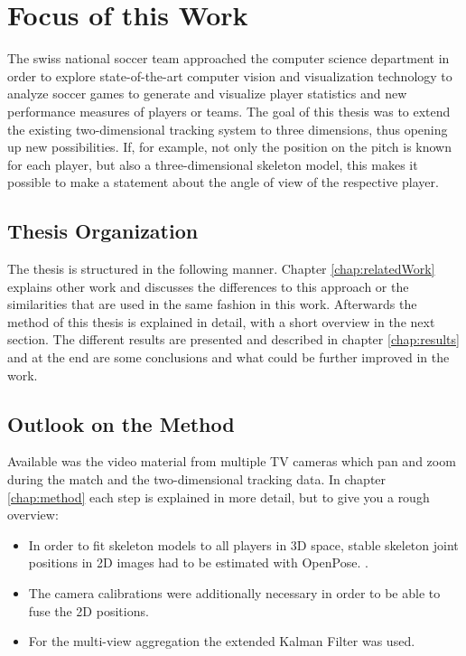 \section{Focus of this Work}
The swiss national soccer team approached the computer science department in order to explore state-of-the-art computer vision and visualization technology to analyze soccer games to generate and visualize player statistics and new performance measures of players or teams. The goal of this thesis was to extend the existing two-dimensional tracking system to three dimensions, thus opening up new possibilities. If, for example, not only the position on the pitch is known for each player, but also a three-dimensional skeleton model, this makes it possible to make a statement about the angle of view of the respective player.

\subsection{Thesis Organization}
The thesis is structured in the following manner. Chapter \ref{chap:relatedWork} explains other work and discusses the differences to this approach or the similarities that are used in the same fashion in this work. Afterwards the method of this thesis is explained in detail, with a short overview in the next section. The different results are presented and described in chapter \ref{chap:results} and at the end are some conclusions and what could be further improved in the work.

\subsection{Outlook on the Method}
Available was the video material from multiple TV cameras which pan and zoom during the match and the two-dimensional tracking data. In chapter \ref{chap:method} each step is explained in more detail, but to give you a rough overview:
\begin{itemize}
	\item In order to fit skeleton models to all players in 3D space, stable skeleton joint positions in 2D images had to be estimated with OpenPose. \cite{openpose}. 
	\item The camera calibrations were additionally necessary in order to be able to fuse the 2D positions.
	\item For the multi-view aggregation the extended Kalman Filter was used.
\end{itemize}

